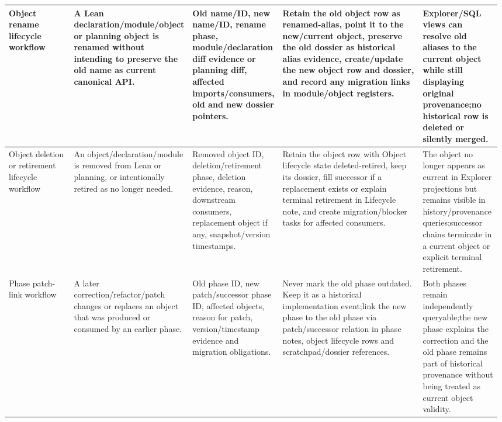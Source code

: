 \begin{longtable}{L{0.14\linewidth} L{0.19\linewidth} L{0.18\linewidth} L{0.31\linewidth} L{0.16\linewidth}}
\hline
\addlinespace[0.24em]
Object rename lifecycle workflow & A Lean declaration/\allowbreak{}module/\allowbreak{}object or planning object is renamed without intending to preserve the old name as current canonical API. & Old name/\allowbreak{}ID, new name/\allowbreak{}ID, rename phase, module/\allowbreak{}declaration diff evidence or planning diff, affected imports/\allowbreak{}consumers, old and new dossier pointers. & Retain the old object row as renamed-alias, point it to the new/\allowbreak{}current object, preserve the old dossier as historical alias evidence, create/\allowbreak{}update the new object row and dossier, and record any migration links in module/\allowbreak{}object registers. & Explorer/\allowbreak{}SQL views can resolve old aliases to the current object while still displaying original provenance;\newline no historical row is deleted or silently merged.\\
\hline
\addlinespace[0.24em]
Object deletion or retirement lifecycle workflow & An object/\allowbreak{}declaration/\allowbreak{}module is removed from Lean or planning, or intentionally retired as no longer needed. & Removed object ID, deletion/\allowbreak{}retirement phase, deletion evidence, reason, downstream consumers, replacement object if any, snapshot/\allowbreak{}version timestamps. & Retain the object row with Object lifecycle state deleted-retired, keep its dossier, fill successor if a replacement exists or explain terminal retirement in Lifecycle note, and create migration/\allowbreak{}blocker tasks for affected consumers. & The object no longer appears as current in Explorer projections but remains visible in history/\allowbreak{}provenance queries;\newline successor chains terminate in a current object or explicit terminal retirement.\\
\hline
\addlinespace[0.24em]
Phase patch-link workflow & A later correction/\allowbreak{}refactor/\allowbreak{}patch changes or replaces an object that was produced or consumed by an earlier phase. & Old phase ID, new patch/\allowbreak{}successor phase ID, affected objects, reason for patch, version/\allowbreak{}timestamp evidence and migration obligations. & Never mark the old phase outdated. Keep it as a historical implementation event;\newline link the new phase to the old phase via patch/\allowbreak{}successor relation in phase notes, object lifecycle rows and scratchpad/\allowbreak{}dossier references. & Both phases remain independently queryable;\newline the new phase explains the correction and the old phase remains part of historical provenance without being treated as current object validity.\\

\end{longtable}
